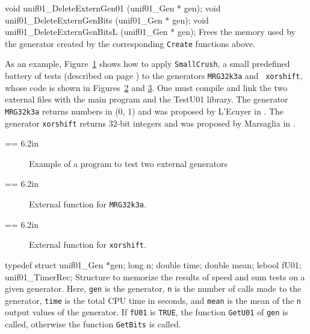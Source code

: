 void unif01_DeleteExternGen01 (unif01_Gen * gen);
void unif01_DeleteExternGenBits (unif01_Gen * gen);
void unif01_DeleteExternGenBitsL (unif01_Gen * gen);
\endcode
 \tab  Frees the memory used by the generator created by the corresponding
 {\tt Create} functions above.
 \endtab


\bigskip
As an example, Figure~\ref{prog:ex7}  shows how to apply
 {\tt SmallCrush}, a small predefined battery of tests (described on page
 \pageref{bat:SmallCrush}) to the generators {\tt MRG32k3a} and {\tt
xorshift}, whose code is shown in Figures~\ref{fig:MRG32k3a} and
 \ref{fig:xorshift}.  One must compile and link the two external
files with the main program and the TestU01 library.
The generator {\tt MRG32k3a} returns numbers in (0, 1) and was
proposed by L'Ecuyer in \cite{rLEC99b}.
The generator {\tt xorshift} returns 32-bit integers 
and was proposed by Marsaglia in \cite[page 4]{rMAR03a}.



=\vbox {\hsize = 6.2in
{\smallc
}
}

\begin{figure} \centering {}
\caption {Example of a program to test two external generators}
\label {prog:ex7}
\end{figure}


=\vbox {\hsize = 6.2in
{\smallc
}
}

\begin{figure} \centering {}
\caption {External function for {\tt MRG32k3a}.}
\label {fig:MRG32k3a}
\end{figure}


=\vbox {\hsize = 6.2in
{\smallc
}
}

\begin{figure} \centering {}
\caption {External function for {\tt xorshift}.}
\label {fig:xorshift}
\end{figure}



\code

typedef struct {
   unif01_Gen *gen;
   long n;
   double time;
   double mean;
   lebool fU01;
   } unif01_TimerRec;
\endcode
 \tab  Structure to memorize the results of speed and sum tests on a given
   generator. Here, {\tt gen} is the generator,
   {\tt n} is the number of calls made to the generator,
   {\tt time} is the total CPU time in seconds, and
   {\tt mean} is the mean of the {\tt n} output values of the generator.
   If {\tt fU01} is  {\tt TRUE}, the function {\tt GetU01} of 
   {\tt gen} is called, otherwise the function  {\tt GetBits} is called.
 \endtab
\code


